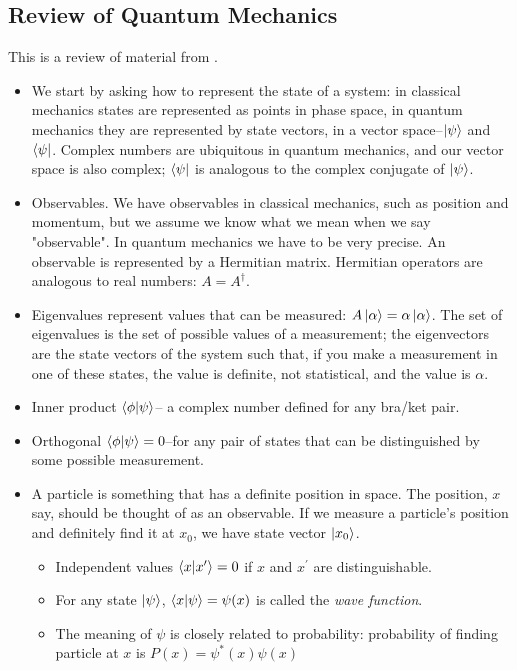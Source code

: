 \documentclass[]{article}
\begin{document}
\subsection{Review of Quantum Mechanics}
 This is a review of material from \cite{susskind2012quantum,susskind2014quantum}.
\begin{itemize}
	\item We start by asking how to represent the state of a system: in classical mechanics states are represented as points in phase space, in quantum mechanics they are represented by state vectors, in a vector space--$\ket{\psi}$ and $\bra{\psi}$. Complex numbers are ubiquitous in quantum mechanics, and our vector space is also complex; $\bra{\psi}$ is analogous to the complex conjugate of $\ket{\psi}$.
	\item Observables. We have observables in classical mechanics, such as position and momentum, but we assume we know what we mean when we say "observable". In quantum mechanics we have to be very precise. An observable is represented by a Hermitian matrix. Hermitian operators are analogous to real numbers: $A=A^{\dag}$.
	\item Eigenvalues represent values that can be measured: $A\ket{\alpha} = \alpha\ket{\alpha}$. The set of eigenvalues is the set of possible values of a measurement; the eigenvectors are the state vectors of the system such that, if you make a measurement in one of these states, the value is definite, not statistical, and the value is $\alpha$.
	\item Inner product $\braket{\phi|\psi}$-- a complex number defined for any bra/ket pair.
	\item Orthogonal $\braket{\phi|\psi}=0$--for any pair of states that can be distinguished by some possible measurement.
	\item A particle is something that has a definite position in space. The position, $x$ say, should be thought of as an observable. If we measure a particle's position and definitely find it at $x_0$, we have state vector $\ket{x_0}$.
	\begin{itemize}
		\item Independent values $\braket{x|x^{\prime}}=0$ if $x$ and $x^{\prime}$ are distinguishable.
		\item For any state $\ket{\psi}$, $\braket{x|\psi} = \psi(x)$ is called the \emph{wave function}. 
		\item The meaning of $\psi$ is closely related to probability: probability of finding particle at $x$ is $P(x)=\psi^*(x)\psi(x)$

\end{itemize}
\end{itemize}
\end{document}
